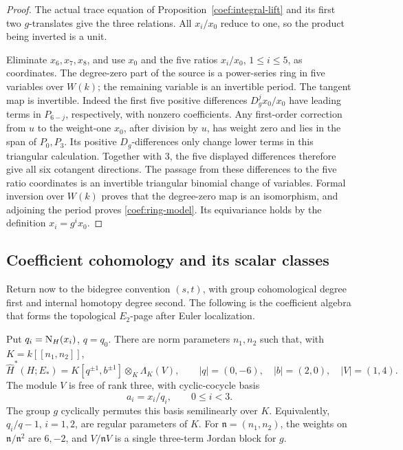 \begin{proof}
The actual trace equation of Proposition~\ref{coef:integral-lift}
and its first two \(g\)-translates give the three relations.
All \(x_i/x_0\) reduce to one, so the product being inverted is a unit.

Eliminate \(x_6,x_7,x_8\), and use \(x_0\) and the five ratios
\(x_i/x_0\), \(1\le i\le5\), as coordinates.  The degree-zero part
of the source is a power-series ring in five variables over \(W(k)\);
the remaining variable is an invertible period.
The tangent map is invertible.  Indeed the first five positive
differences \(D_g^j x_0/x_0\) have leading terms in
\(P_{6-j}\), respectively, with nonzero coefficients.  Any
first-order correction from \(u\) to the weight-one \(x_0\), after
division by \(u\), has weight zero and lies in the span of \(P_0,P_3\).
Its positive \(D_g\)-differences only change lower terms in this
triangular calculation.  Together with \(3\), the five displayed
differences therefore give all six cotangent directions.
The passage from these differences to the five ratio coordinates
is an invertible triangular binomial change of variables.
Formal inversion over \(W(k)\) proves that the degree-zero map is an
isomorphism, and adjoining the period proves
\eqref{coef:ring-model}.  Its equivariance holds by the definition
\(x_i=g^i x_0\).
\end{proof}

\subsection{Coefficient cohomology and its scalar classes}

Return now to the bidegree convention \((s,t)\), with group cohomological
degree first and internal homotopy degree second.  The following is the
coefficient algebra that forms the topological \(E_2\)-page after
Euler localization.

\begin{proposition}\label{coef:h-cohomology}
Put \(q_i=\operatorname{N}_H(x_i)\), \(q=q_0\).  There are norm parameters \(n_1,n_2\)
such that, with \(K=k[[n_1,n_2]]\),
\begin{equation}\label{coef:h-tate-ring}
 \widehat H^*(H;E_*)=
 K[q^{\pm1},b^{\pm1}]\otimes_K\Lambda_K(V),
 \qquad |q|=(0,-6),\quad |b|=(2,0),\quad |V|=(1,4).
\end{equation}
The module \(V\) is free of rank three, with cyclic-cocycle basis
\[
 a_i=x_i/q_i,\qquad 0\le i<3.
\]
The group \(g\) cyclically permutes this basis semilinearly over \(K\).
Equivalently, \(q_i/q-1\), \(i=1,2\), are regular parameters of \(K\).
For \(\mathfrak n=(n_1,n_2)\), the weights on
\(\mathfrak n/\mathfrak n^2\) are \(6,-2\), and \(V/\mathfrak n V\)
is a single three-term Jordan block for \(g\).
\end{proposition}

